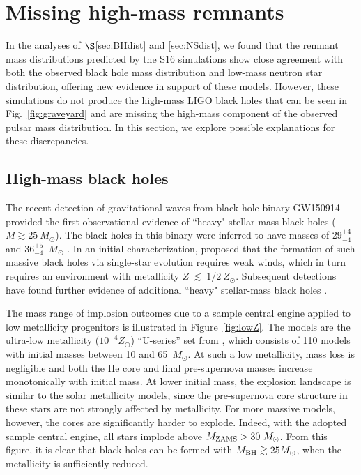 \documentclass[]{emulateapj}
\newcommand{\Ms}{M_{\odot}}
\newcommand{\Mb}{M_{\rm BH}}
\newcommand{\Mz}{M_{\rm ZAMS}}
\begin{document}
\section{Missing high-mass remnants}
\label{sec:highM}
In the analyses of $\S$\ref{sec:BHdist} and \ref{sec:NSdist}, we found that the remnant mass distributions predicted by the S16 simulations show close agreement with both the observed black hole mass distribution and low-mass neutron star distribution, offering new evidence in support of these models. However, these simulations do not produce the high-mass LIGO black holes that can be seen in Fig.~\ref{fig:graveyard} and are missing the high-mass component of the observed pulsar mass distribution. In this section, we explore possible explanations for these discrepancies.

\subsection{High-mass black holes}
\label{sec:LIGO}
The recent detection of gravitational waves from black hole binary GW150914 provided the first observational evidence of ``heavy" stellar-mass black holes ($M \gtrsim 25~\Ms$). The black holes in this binary were inferred to have masses of 29$^{+4}_{-4}$ and 36$^{+5}_{-4}$~$\Ms$ \citep{Abbott2016}. In an initial characterization, \citet{Abbott2016a} proposed that the formation of such massive black holes via single-star evolution requires weak winds, which in turn requires an environment with metallicity $Z~\lesssim~1/2~Z_{\odot}$. Subsequent detections have found further evidence of additional ``heavy" stellar-mass black holes \citep{Abbott2016b, Abbott2017, LIGOVirgo2017}.

The mass range of implosion outcomes due to a sample central engine applied to low metallicity progenitors is illustrated in Figure~\ref{fig:lowZ}. The models are the ultra-low metallicity ($10^{-4}Z_\odot$) ``U-series'' set from \citet{Sukhbold2014}, which consists of 110 models with initial masses between 10 and 65~$M_\odot$. At such a low metallicity, mass loss is negligible and both the He core and final pre-supernova masses increase monotonically with initial mass. At lower initial mass, the explosion landscape is similar to the solar metallicity models, since the pre-supernova core structure in these stars are not strongly affected by metallicity. For more massive models, however, the cores are significantly harder to explode. Indeed, with the adopted sample central engine, all stars implode above $\Mz>30\ M_\odot$. From this figure, it is clear that black holes can be formed with $\Mb \gtrsim 25\Ms$, when the metallicity is sufficiently reduced.
\end{document}
